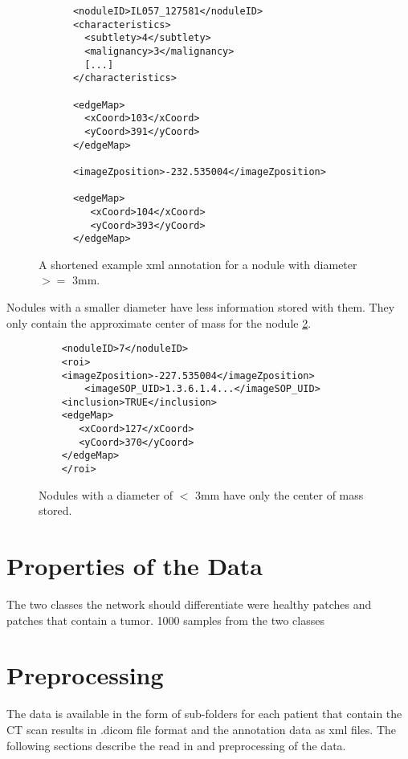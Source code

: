 \documentclass[../Thesis.tex]{subfiles}
\begin{document}
\begin{figure}
\begin{lstlisting}
      <noduleID>IL057_127581</noduleID>
      <characteristics>
        <subtlety>4</subtlety>
        <malignancy>3</malignancy>
        [...]
      </characteristics>
      
      <edgeMap>
        <xCoord>103</xCoord>
        <yCoord>391</yCoord>
      </edgeMap>
 
      <imageZposition>-232.535004</imageZposition>
       
      <edgeMap>
         <xCoord>104</xCoord>
         <yCoord>393</yCoord>
      </edgeMap>
\end{lstlisting}
\caption{A shortened example xml annotation for a nodule with diameter $>=$ 3mm.}
\label{fig:bigNod}
\end{figure}

Nodules with a smaller diameter have less information stored with them. They only contain the approximate center of mass for the nodule \ref{fig:smallNod}.

\begin{figure}
\begin{lstlisting}
	<noduleID>7</noduleID>
	<roi>
	<imageZposition>-227.535004</imageZposition>
        <imageSOP_UID>1.3.6.1.4...</imageSOP_UID>
	<inclusion>TRUE</inclusion>
	<edgeMap>
	   <xCoord>127</xCoord>
	   <yCoord>370</yCoord>
	</edgeMap>
	</roi>
\end{lstlisting}
\caption{Nodules with a diameter of $<$ 3mm have only the center of mass stored.}
\label{fig:smallNod}
\end{figure}

\section{Properties of the Data}

The two classes the network should differentiate were healthy patches and patches that contain a tumor. 1000 samples from the two classes 

\section{Preprocessing}
The data is available in the form of sub-folders for each patient that contain the CT scan results in .dicom file format and the annotation data as xml files. The following sections describe the read in and preprocessing of the data.
\end{document}
